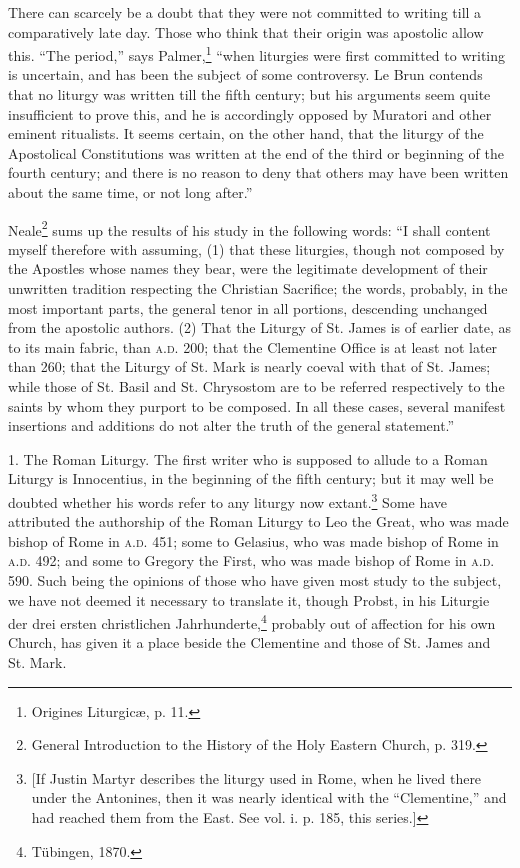 There can scarcely be a doubt that they were not committed to writing till a comparatively late day. Those who think that their origin was apostolic allow this. “The period,” says Palmer,\footnote{\par  Origines Liturgicæ, p. 11.} “when liturgies were first committed to writing is uncertain, and has been the subject of some controversy. Le Brun contends that no liturgy was written till the fifth century; but his arguments seem quite insufficient to prove this, and he is accordingly opposed by Muratori and other eminent ritualists. It seems certain, on the other hand, that the liturgy of the Apostolical Constitutions was written at the end of the third or beginning of the fourth century; and there is no reason to deny that others may have been written about the same time, or not long after.”

Neale\footnote{\par  General Introduction to the History of the Holy Eastern Church, p. 319.} sums up the results of his study in the following words: “I shall content myself therefore with assuming, (1) that these liturgies, though not composed by the Apostles whose names they bear, were the legitimate development of their unwritten tradition respecting the Christian Sacrifice; the words, probably, in the most important parts, the general tenor in all portions, descending unchanged from the apostolic authors. (2) That the Liturgy of St. James is of earlier date, as to its main fabric, than \textsc{a.d.} 200; that the Clementine Office is at least not later than 260; that the Liturgy of St. Mark is nearly coeval with that of St. James; while those of St. Basil and St. Chrysostom are to be referred respectively to the saints by whom they purport to be composed. In all these cases, several manifest insertions and additions do not alter the truth of the general statement.”

1. The Roman Liturgy. The first writer who is supposed to allude to a Roman Liturgy is Innocentius, in the beginning of the fifth century; but it may well be doubted whether his words refer to any liturgy now extant.\footnote{\par{}  [If Justin Martyr describes the liturgy used in Rome, when he lived there under the Antonines, then it was nearly identical with the “Clementine,” and had reached them from the East. See vol. i. p. 185, this series.]} Some have attributed the authorship of the Roman Liturgy to Leo the Great, who was made bishop of Rome in \textsc{a.d.} 451; some to Gelasius, who was made bishop of Rome in \textsc{a.d.} 492; and some to Gregory the First, who was made bishop of Rome in \textsc{a.d.} 590. Such being the opinions of those who have given most study to the subject, we have not deemed it necessary to translate it, though Probst, in his Liturgie der drei ersten christlichen Jahrhunderte,\footnote{\par  Tübingen, 1870.} probably out of affection for his own Church, has given it a place beside the Clementine and those of St. James and St. Mark.

